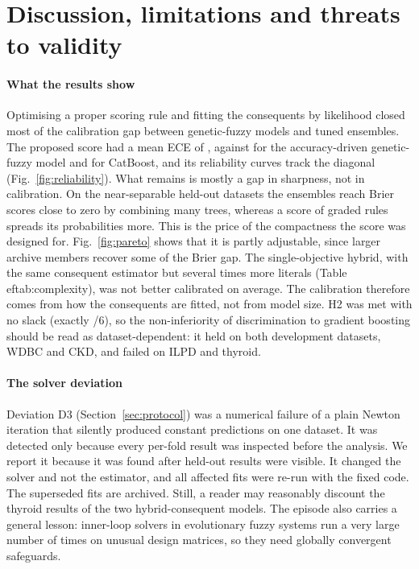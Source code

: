 \section{Discussion, limitations and threats to validity}
\label{sec:discussion}

\paragraph{What the results show}
Optimising a proper scoring rule and fitting the consequents by likelihood closed most
of the calibration gap between genetic-fuzzy models and tuned ensembles. The proposed
score had a mean ECE of \resMeanEceAllMOFuzzyNSGAII{}, against
\resMeanEceAllSOGAFuzzyClassic{} for the accuracy-driven genetic-fuzzy model and
\resMeanEceAllCatBoost{} for CatBoost, and its reliability curves track the diagonal
(Fig.~\ref{fig:reliability}). What remains is mostly a gap in sharpness, not in
calibration. On the near-separable held-out datasets the ensembles reach Brier scores
close to zero by combining many trees, whereas a score of
\resMORulesThyroid{} graded rules spreads its probabilities more. This is the price of
the compactness the score was designed for. Fig.~\ref{fig:pareto} shows that it is
partly adjustable, since larger archive members recover some of the Brier gap. The
single-objective hybrid, with the same consequent estimator but several times more
literals (Table~
ef{tab:complexity}), was not better calibrated on average. The calibration therefore comes from
how the consequents are fitted, not from model size. H2 was met with no slack (exactly
\resHTwoN{}/6), so the non-inferiority of discrimination to gradient boosting should be
read as dataset-dependent: it held on both development datasets, WDBC and CKD, and
failed on ILPD and thyroid.

\paragraph{The solver deviation}
Deviation D3 (Section~\ref{sec:protocol}) was a numerical failure of a plain Newton
iteration that silently produced constant predictions on one dataset. It was detected
only because every per-fold result was inspected before the analysis. We report it
because it was found after held-out results were visible. It changed the solver and
not the estimator, and all affected fits were re-run with the fixed code. The
superseded fits are archived. Still, a reader may reasonably discount the thyroid
results of the two hybrid-consequent models. The episode also carries a general
lesson: inner-loop solvers in evolutionary fuzzy systems run a very large number of times on
unusual design matrices, so they need globally convergent safeguards.


